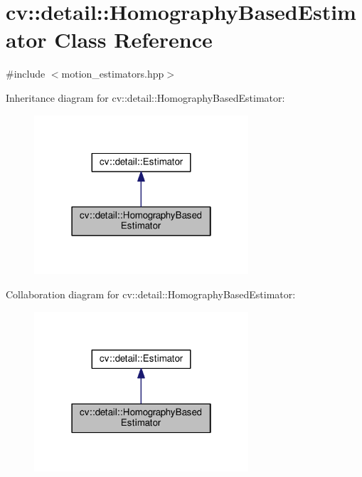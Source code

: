 \hypertarget{classcv_1_1detail_1_1HomographyBasedEstimator}{\section{cv\-:\-:detail\-:\-:Homography\-Based\-Estimator Class Reference}
\label{classcv_1_1detail_1_1HomographyBasedEstimator}
}


{\ttfamily \#include $<$motion\-\_\-estimators.\-hpp$>$}



Inheritance diagram for cv\-:\-:detail\-:\-:Homography\-Based\-Estimator\-:\nopagebreak
\begin{figure}[H]
\begin{center}
\leavevmode
\includegraphics[width=226pt]{classcv_1_1detail_1_1HomographyBasedEstimator__inherit__graph}
\end{center}
\end{figure}


Collaboration diagram for cv\-:\-:detail\-:\-:Homography\-Based\-Estimator\-:\nopagebreak
\begin{figure}[H]
\begin{center}
\leavevmode
\includegraphics[width=226pt]{classcv_1_1detail_1_1HomographyBasedEstimator__coll__graph}
\end{center}
\end{figure}
